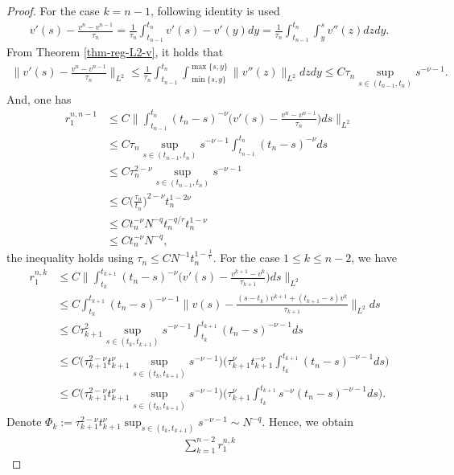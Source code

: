 \documentclass[11pt]{article}
\numberwithin{equation}{section}
\begin{document}
\begin{proof}
For the case $k= n-1$, following identity is used
\begin{align*}
v'(s)-\frac{v^{n}-v^{n-1}}{\tau_{n}}=\frac{1}{\tau_{n}}\int_{t_{n-1}}^{t_{n}}v'(s)-v'(y)dy=\frac{1}{\tau_{n}}\int_{t_{n-1}}^{t_{n}}\int_{y}^sv''(z)dzdy.
\end{align*}
From Theorem \ref{thm-reg-L2-v}, it holds that
\begin{align*}
\bigg\|v'(s)-\frac{v^{n}-v^{n-1}}{\tau_{n}}\bigg\|_{L^2}
\le \frac{1}{\tau_{n}}\int_{t_{n-1}}^{t_{n}}\int_{\min\{s,y\}}^{\max\{s,y\}}\|v''(z)\|_{L^2}dzdy\le C\tau_{n}\sup_{s\in(t_{n-1},t_n)} s^{-\nu-1}.
\end{align*}
And, one has
\begin{align*}
r_1^{n,n-1}
&\le C\bigg\|\int_{t_{n-1}}^{t_{n}}(t_n-s)^{-\nu}\bigg(v'(s)-\frac{v^{n}-v^{n-1}}{\tau_{n}}\bigg)ds\bigg\|_{L^2}\\
&\le C\tau_{n}\sup_{s\in(t_{n-1},t_n)} s^{-\nu-1}\int_{t_{n-1}}^{t_{n}}(t_n-s)^{-\nu}ds\\
&\le C\tau_n^{2-\nu}\sup_{s\in(t_{n-1},t_n)} s^{-\nu-1}\\
&\le C\bigg(\frac{\tau_n}{t_n}\bigg)^{2-\nu}t_n^{1-2\nu}\\
&\le Ct_n^{-\nu}N^{-q}t_n^{-q/r}t_n^{1-\nu}\\
&\le Ct_n^{-\nu}N^{-q},
\end{align*}
the inequality holds using $\tau_n\leq CN^{-1}t_n^{1-\frac{1}{r}}$.
For the case $1\le k\le n-2$, we have
\begin{align*}
r_1^{n,k}
&\le C\bigg\|\int_{t_{k}}^{t_{k+1}}(t_n-s)^{-\nu}\bigg(v'(s)-\frac{v^{k+1}-v^{k}}{\tau_{k+1}}\bigg)ds\bigg\|_{L^2}\\
&\le C\int_{t_{k}}^{t_{k+1}}(t_n-s)^{-\nu-1}\bigg\|v(s)-\frac{(s-t_k)v^{k+1}+(t_{k+1}-s)v^{k}}{\tau_{k+1}}\bigg\|_{L^2}ds\\
&\le C\tau_{k+1}^2\sup_{s\in(t_k,t_{k+1})}s^{-\nu-1}\int_{t_{k}}^{t_{k+1}}(t_n-s)^{-\nu-1}ds\\
&\le C\bigg(\tau_{k+1}^{2-\nu}t_{k+1}^\nu\sup_{s\in(t_k,t_{k+1})}s^{-\nu-1}\bigg)\bigg(\tau_{k+1}^\nu t_{k+1}^{-\nu}\int_{t_k}^{t_{k+1}}(t_n-s)^{-\nu-1}ds\bigg)\\
&\le C\bigg(\tau_{k+1}^{2-\nu}t_{k+1}^\nu\sup_{s\in(t_k,t_{k+1})}s^{-\nu-1}\bigg)\bigg(\tau_{k+1}^\nu \int_{t_k}^{t_{k+1}}s^{-\nu}(t_n-s)^{-\nu-1}ds\bigg).
\end{align*}
Denote $\Phi_k:=\tau_{k+1}^{2-\nu}t_{k+1}^\nu\sup_{s\in(t_k,t_{k+1})}s^{-\nu-1}\sim N^{-q}$. Hence, we obtain
\begin{align*}
\sum_{k=1}^{n-2}r_1^{n,k}

\end{align*}
\end{proof}
\end{document}
